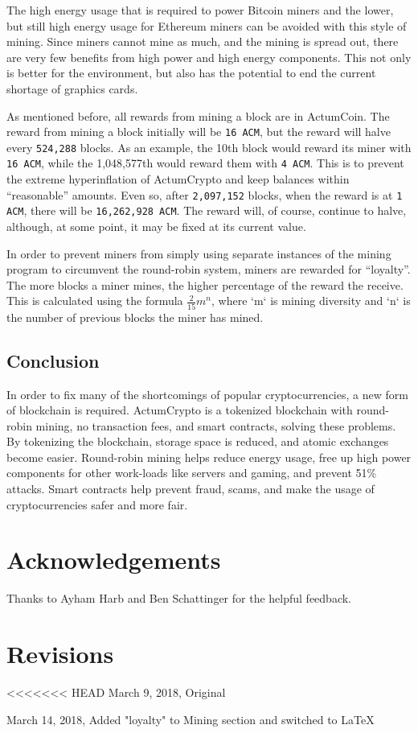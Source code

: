 \documentclass[letter]{article}
\begin{document}
The high energy usage that is required to power Bitcoin miners and the lower, but still high energy usage for Ethereum miners can be avoided with this style of mining. Since miners cannot mine as much, and the mining is spread out, there are very few benefits from high power and high energy components. This not only is better for the environment, but also has the potential to end the current shortage of graphics cards.

As mentioned before, all rewards from mining a block are in ActumCoin. The reward from mining a block initially will be \texttt{16 ACM}, but the reward will halve every \texttt{524,288} blocks. As an example, the 10th block would reward its miner with \texttt{16 ACM}, while the 1,048,577th would reward them with \texttt{4 ACM}. This is to prevent the extreme hyperinflation of ActumCrypto and keep balances within “reasonable” amounts. Even so, after \texttt{2,097,152} blocks, when the reward is at \texttt{1 ACM}, there will be \texttt{16,262,928 ACM}. The reward will, of course, continue to halve, although, at some point, it may be fixed at its current value.

In order to prevent miners from simply using separate instances of the mining program to circumvent the round-robin system, miners are rewarded for “loyalty”. The more blocks a miner mines, the higher percentage of the reward the receive. This is calculated using the formula $\frac{2}{15}m^{n}$, where `m` is mining diversity and `n` is the number of previous blocks the miner has mined. 
\subsection{Conclusion}
In order to fix many of the shortcomings of popular cryptocurrencies, a new form of blockchain is required. ActumCrypto is a tokenized blockchain with round-robin mining, no transaction fees, and smart contracts, solving these problems. By tokenizing the blockchain, storage space is reduced, and atomic exchanges become easier. Round-robin mining helps reduce energy usage, free up high power components for other work-loads like servers and gaming, and prevent 51\% attacks. Smart contracts help prevent fraud, scams, and make the usage of cryptocurrencies safer and more fair.
\pagebreak

\section{Acknowledgements}
Thanks to Ayham Harb and Ben Schattinger for the helpful feedback.

\section{Revisions}
<<<<<<< HEAD
March 9, 2018, Original

March 14, 2018, Added "loyalty" to Mining section and switched to LaTeX

\newpage
\printbibliography
\end{document}
